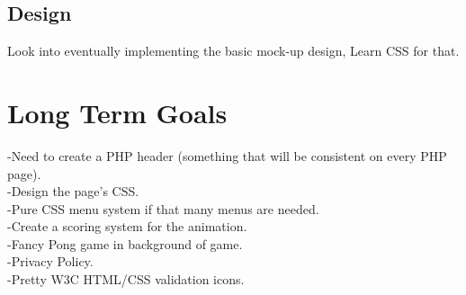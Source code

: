 	\subsection{Design}
	Look into eventually implementing the basic mock-up design, Learn CSS for that.
	
\section{Long Term Goals}
	-Need to create a PHP header (something that will be consistent on every PHP page).\\
	-Design the page's CSS.\\
	-Pure CSS menu system if that many menus are needed.\\
	-Create a scoring system for the animation.\\
	-Fancy Pong game in background of game.\\
	-Privacy Policy.\\
	-Pretty W3C HTML/CSS validation icons.\\




